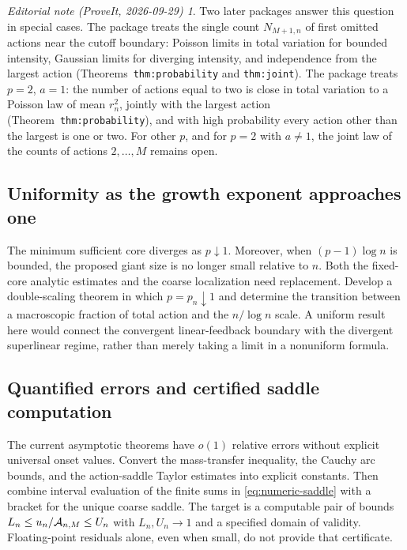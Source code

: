 \documentclass[11pt,a4paper]{article}
\numberwithin{equation}{section}
\theoremstyle{definition}
\theoremstyle{remark}
\newtheorem*{ednote}{Editorial note (ProveIt, 2026-09-29)}
\begin{document}
\begin{ednote}
Two later packages answer this question in special cases. The package
\cite{ed:plb} treats the single count $N_{M+1,n}$ of first omitted actions
near the cutoff boundary: Poisson limits in total variation for bounded
intensity, Gaussian limits for diverging intensity, and independence from
the largest action (Theorems~\texttt{thm:probability} and
\texttt{thm:joint}). The package \cite{ed:mic} treats $p=2$, $a=1$: the
number of actions equal to two is close in total variation to a Poisson law
of mean $r_n^2$, jointly with the largest action
(Theorem~\texttt{thm:probability}), and with high probability every action
other than the largest is one or two. For other $p$, and for $p=2$ with $a\ne1$, the joint
law of the counts of actions $2,\ldots,M$ remains open.
\end{ednote}

\subsection{Uniformity as the growth exponent approaches one}

The minimum sufficient core diverges as $p\downarrow1$. Moreover, when
$(p-1)\log n$ is bounded, the proposed giant size is no longer small
relative to $n$. Both the fixed-core analytic estimates and the coarse
localization need replacement. Develop a double-scaling theorem in which
$p=p_n\downarrow1$ and determine the transition between a macroscopic
fraction of total action and the $n/\log n$ scale. A uniform result here
would connect the convergent linear-feedback boundary with the divergent
superlinear regime, rather than merely taking a limit in a nonuniform
formula.

\subsection{Quantified errors and certified saddle computation}

The current asymptotic theorems have $o(1)$ relative errors without explicit
universal onset values. Convert the mass-transfer inequality, the Cauchy
arc bounds, and the action-saddle Taylor estimates into explicit constants.
Then combine interval evaluation of the finite sums in
\eqref{eq:numeric-saddle} with a bracket for the unique coarse saddle.
The target is a computable pair of bounds
$L_n\le u_n/\mathcal A_{n,M}\le U_n$ with $L_n,U_n\to1$ and a
specified domain of validity. Floating-point residuals alone, even when
small, do not provide that certificate.
\end{document}
